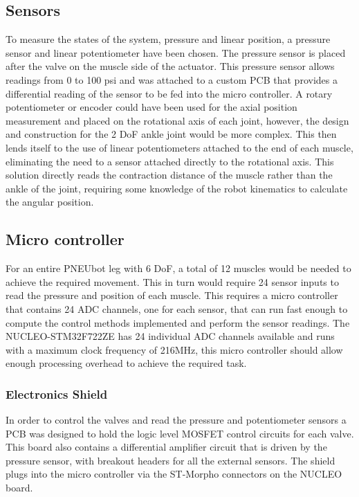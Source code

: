 \documentclass[11pt,a4paper]{article}
\begin{document}
\subsection{Sensors}
\label{sub:sensors}
To measure the states of the system, pressure and linear position, a pressure sensor and linear potentiometer have been chosen. The pressure sensor is placed after the valve on the muscle side of the actuator. This pressure sensor \cite{NBPLANN100PGUNV} allows readings from 0 to 100 psi and was attached to a custom PCB that provides a differential reading of the sensor to be fed into the micro controller. A rotary potentiometer or encoder could have been used for the axial position measurement and placed on the rotational axis of each joint, however, the design and construction for the 2 DoF ankle joint would be more complex. This then lends itself to the use of linear potentiometers attached to the end of each muscle, eliminating the need to a sensor attached directly to the rotational axis. This solution directly reads the contraction distance of the muscle rather than the ankle of the joint, requiring some knowledge of the robot kinematics to calculate the angular position.

\subsection{Micro controller}
\label{sub:microcontroller}
For an entire PNEUbot leg with 6 DoF, a total of 12 muscles would be needed to achieve the required movement. This in turn would require 24 sensor inputs to read the pressure and position of each muscle. This requires a micro controller that contains 24 ADC channels, one for each sensor, that can run fast enough to compute the control methods implemented and perform the sensor readings. The NUCLEO-STM32F722ZE \cite{nucleo_stm32f722ze} has 24 individual ADC channels available and runs with a maximum clock frequency of 216MHz, this micro controller should allow enough processing overhead to achieve the required task.

\subsubsection{Electronics Shield}
\label{sub:shield}
In order to control the valves and read the pressure and potentiometer sensors a PCB was designed to hold the logic level MOSFET control circuits for each valve. This board also contains a differential amplifier circuit that is driven by the pressure sensor, with breakout headers for all the external sensors. The shield plugs into the micro controller via the ST-Morpho connectors on the NUCLEO board. %
\end{document}
